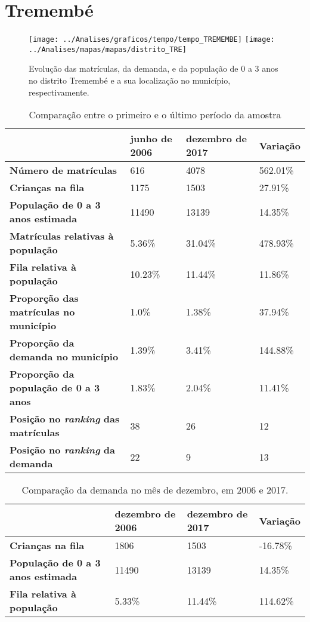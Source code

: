 \section{Tremembé}
\begin{figure}[H]
\centering
\texttt{[image: ../Analises/graficos/tempo/tempo\_TREMEMBE]}
\texttt{[image: ../Analises/mapas/mapas/distrito\_TRE]}
\caption{Evolução das matrículas, da demanda, e da população de 0 a 3 anos no distrito Tremembé e a sua localização no município, respectivamente.}
\end{figure}
\begin{table}[H]
\begin{tabular}{l|l|l|l}
\textbf{}                                      & \textbf{junho de 2006}       & \textbf{dezembro de 2017}    & \textbf{Variação} \\ \hline
\textbf{Número de matrículas}                  & 616 & 4078 & 562.01\% \\ \hline
\textbf{Crianças na fila}                      & 1175 & 1503 & 27.91\% \\ \hline
\textbf{População de 0 a 3 anos estimada}      & 11490 & 13139 & 14.35\% \\ \hline
\textbf{Matrículas relativas à população}      & 5.36\% & 31.04\% & 478.93\% \\ \hline
\textbf{Fila relativa à população}             & 10.23\% & 11.44\% & 11.86\% \\ \hline
\textbf{Proporção das matrículas no município} & 1.0\% & 1.38\% & 37.94\% \\ \hline
\textbf{Proporção da demanda no município}     & 1.39\% & 3.41\% & 144.88\% \\ \hline
\textbf{Proporção da população de 0 a 3 anos}  & 1.83\% & 2.04\% & 11.41\% \\ \hline
\textbf{Posição no \textit{ranking} das matrículas}     & 38 & 26 & 12 \\ \hline
\textbf{Posição no \textit{ranking} da demanda}         & 22 & 9 & 13 \\ 
\end{tabular}
\caption{Comparação entre o primeiro e o último período da amostra}
\end{table}
\begin{table}[H]
\begin{tabular}{l|l|l|l}
\textbf{}                                 & \textbf{dezembro de 2006} & \textbf{dezembro de 2017} & \textbf{Variação} \\ \hline
\textbf{Crianças na fila}                      & 1806 & 1503 & -16.78\% \\ \hline
\textbf{População de 0 a 3 anos estimada}      & 11490 & 13139 & 14.35\% \\ \hline
\textbf{Fila relativa à população}             & 5.33\% & 11.44\% & 114.62\% \\
\end{tabular}
\caption{Comparação da demanda no mês de dezembro, em 2006 e 2017.}
\end{table}
